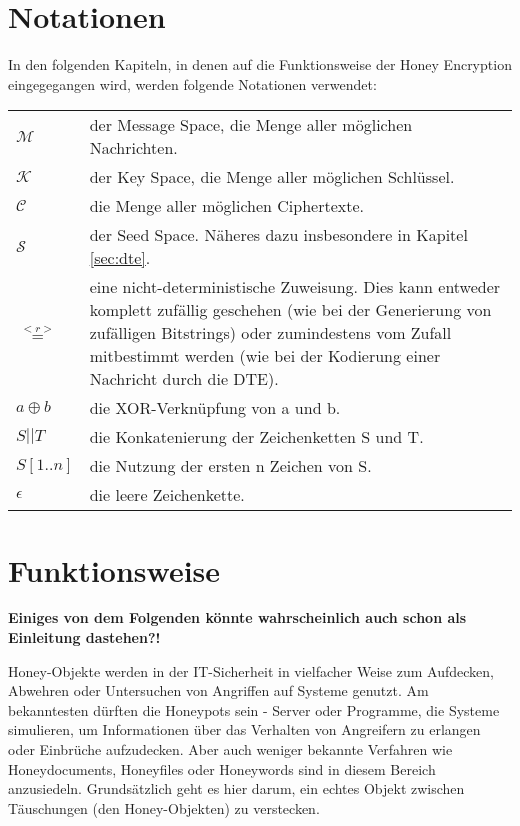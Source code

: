 \section{Notationen}

In den folgenden Kapiteln, in denen auf die Funktionsweise der Honey Encryption eingegegangen wird, werden folgende Notationen verwendet:

\begin{tabular}{lp{14cm}}
\(\mathcal{M}\) & der Message Space, die Menge aller möglichen Nachrichten. \\ 
\(\mathcal{K}\) & der Key Space, die Menge aller möglichen Schlüssel. \\ 
\(\mathcal{C}\) & die Menge aller möglichen Ciphertexte. \\ 
\(\mathcal{S}\) & der Seed Space. Näheres dazu insbesondere in Kapitel \ref{sec:dte}. \\ 
\(\overset{<r>}{=}\) & eine nicht-deterministische Zuweisung. Dies kann entweder komplett zufällig geschehen (wie bei der Generierung von zufälligen Bitstrings) oder zumindestens vom Zufall mitbestimmt werden (wie bei der Kodierung einer Nachricht durch die DTE). \\ 
\(a \oplus b\) & die XOR-Verknüpfung von a und b. \\ 
\(S || T\) & die Konkatenierung der Zeichenketten S und T. \\ 
\(S{[1..n]}\) & die Nutzung der ersten n Zeichen von S. \\ 
\(\epsilon\) & die leere Zeichenkette. \\ 
\end{tabular}

\newpage

\section{Funktionsweise}
\label{sec:funktionsweise}

\textbf{Einiges von dem Folgenden könnte wahrscheinlich auch schon als Einleitung dastehen?!}

Honey-Objekte werden in der IT-Sicherheit in vielfacher Weise zum Aufdecken, Abwehren oder Untersuchen von Angriffen auf Systeme genutzt. Am bekanntesten dürften die Honeypots sein - Server oder Programme, die Systeme simulieren, um Informationen über das Verhalten von Angreifern zu erlangen oder Einbrüche aufzudecken. Aber auch weniger bekannte Verfahren wie Honeydocuments, Honeyfiles oder Honeywords sind in diesem Bereich anzusiedeln. Grundsätzlich geht es hier darum, ein echtes Objekt zwischen Täuschungen (den Honey-Objekten) zu verstecken. 

